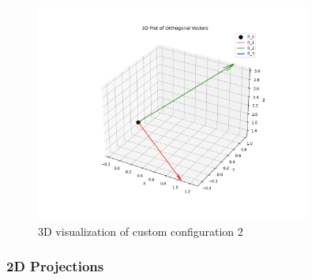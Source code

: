 \begin{figure}[H]
    \centering
    \includegraphics[width=0.8\textwidth]{figures/custom2_3d.png}
    \caption{3D visualization of custom configuration 2}
    \label{fig:example_custom2_3d}
\end{figure}

\subsubsection{2D Projections}


